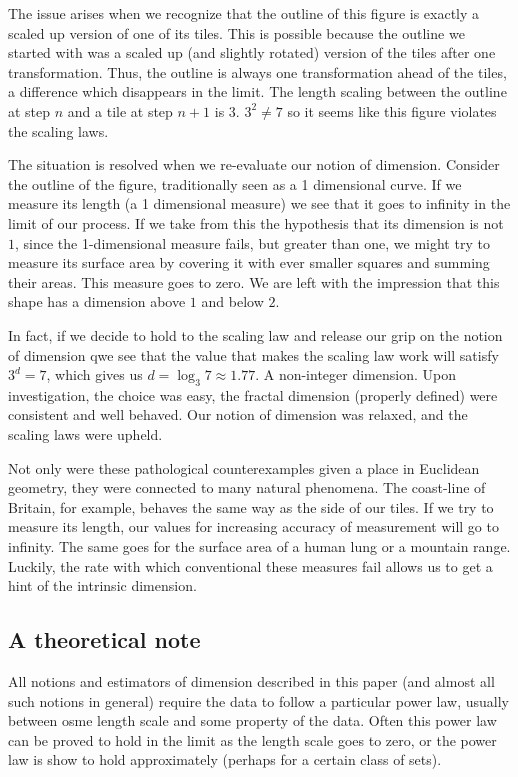 \documentclass[11pt]{article}
\begin{document}
The issue arises when we recognize that the outline of this figure is exactly a scaled up version of one of its tiles. This is possible because the outline we started with was a scaled up (and slightly rotated) version of the tiles after one transformation. Thus, the outline is always one transformation ahead of the tiles, a difference which disappears in the limit. The length scaling between the outline at step $n$ and a tile at step $n+1$ is $3$. $3^2 \neq 7$ so it seems like this figure violates the scaling laws. 

The situation is resolved when we re-evaluate our notion of dimension. Consider the outline of the figure, traditionally seen as a 1 dimensional curve. If we measure its length (a 1 dimensional measure) we see that it goes to infinity in the limit of our process. If we take from this the hypothesis that its dimension is not $1$, since the 1-dimensional measure fails, but greater than one, we might try to measure its surface area by covering it with ever smaller squares and summing their areas. This measure goes to zero. We are left with the impression that this shape has a dimension above $1$ and below $2$.

In fact, if we decide to hold to the scaling law and release our grip on the notion of dimension qwe see that the value that makes the scaling law work will satisfy $3^d = 7$, which gives us  $d = \log_3 7 \approx 1.77$. A non-integer dimension. Upon investigation, the choice was easy, the fractal dimension (properly defined) were consistent and well behaved. Our notion of dimension was relaxed, and the scaling laws were upheld.

Not only were these pathological counterexamples given a place in Euclidean geometry, they were connected to many natural phenomena. The coast-line of Britain, for example, behaves the same way as the side of our tiles. If we try to measure its length, our values for increasing accuracy of measurement will go to infinity. The same goes for the surface area of a human lung or a mountain range. Luckily, the rate with which conventional these measures fail allows us to get a hint of the intrinsic dimension.

\subsection{A theoretical note}

All notions and estimators of dimension described in this paper (and almost all such notions in general) require the data to follow a particular power law, usually between osme length scale and some property of the data. Often this power law can be proved to hold in the limit as the length scale goes to zero, or the power law is show to hold approximately (perhaps for a certain class of sets). 
\end{document}
